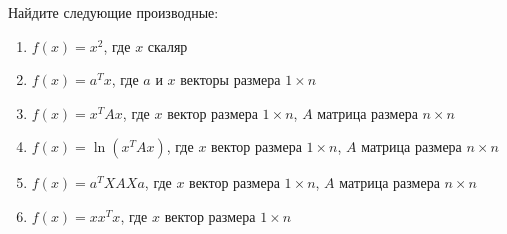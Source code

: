 \begin{problem}{}	
	Найдите следующие производные:
	\begin{enumerate}	
	
	    \item $f(x) = x^2$, где $x$ скаляр
		
		\item $f(x) = a^T x$, где  $a$  и $x$ векторы размера $1 \times n$ 
		
		\item $f(x) = x^T A x$, где $x$ вектор размера $1 \times n$, $A$ матрица размера $n \times n$
		
 		\item $f(x) = \ln(x^T A x)$, где $x$ вектор размера $1 \times n$, $A$ матрица размера $n \times n$
		
		\item $f(x) = a^TXAXa$, где $x$ вектор размера $1 \times n$, $A$ матрица размера $n \times n$
		
 		\item $f(x) = x x^T x$,  где $x$ вектор размера $1 \times n$
	\end{enumerate}
\end{problem} 
